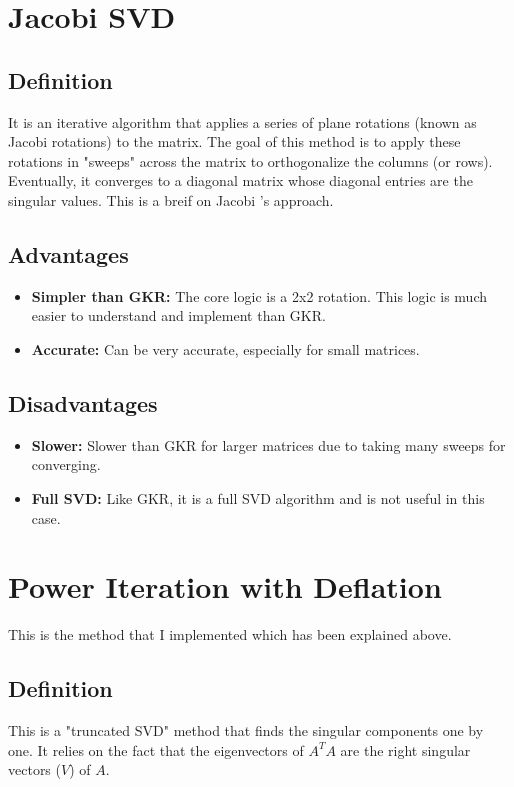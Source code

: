 \documentclass[12pt,a4paper]{article}
\begin{document}
\section{Jacobi SVD}

\subsection*{Definition}
It is an iterative algorithm that applies a series of plane rotations (known as Jacobi rotations) to the matrix. The goal of this method is to apply these rotations in "sweeps" across the matrix to orthogonalize the columns (or rows). Eventually, it converges to a diagonal matrix whose diagonal entries are the singular values.
This is a breif on Jacobi 's approach.


\subsection*{Advantages}
\begin{itemize}
    \item \textbf{Simpler than GKR:} The core logic is a 2x2 rotation. This logic is much easier to understand and implement than GKR.
    \item \textbf{Accurate:} Can be very accurate, especially for small matrices.
\end{itemize}

\subsection*{Disadvantages}
\begin{itemize}
    \item \textbf{Slower:} Slower than GKR for larger matrices due to taking many sweeps for converging.
    \item \textbf{Full SVD:} Like GKR, it is a full SVD algorithm and is not useful in this case.
\end{itemize}

\section{Power Iteration with Deflation}
This is the method that I implemented which has been explained above.
\subsection*{Definition}
This is a "truncated SVD" method that finds the singular components one by one. It relies on the fact that the eigenvectors of $A^TA$ are the right singular vectors ($V$) of $A$.
\end{document}
